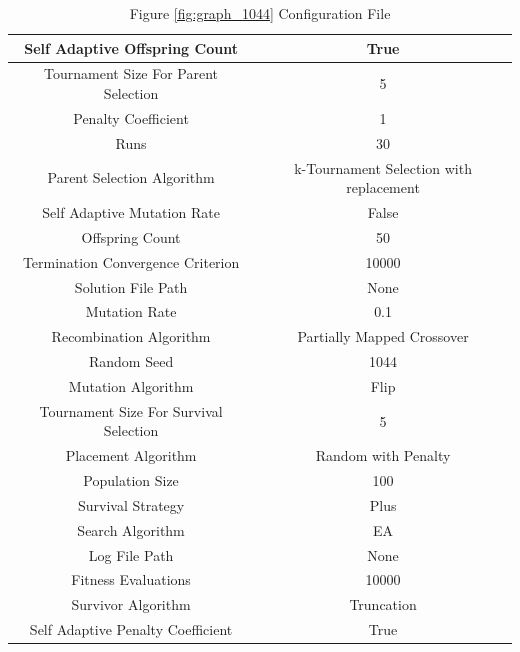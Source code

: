 \documentclass{standalone}
\begin{document}
\begin{table}[!htb]
	\centering
	\caption{Figure \ref{fig:graph_1044} Configuration File}
	\label{tab:graph_1044}
	\begin{tabular}{| c | c |}
		\hline
		Self Adaptive Offspring Count		& True		 \\
		\hline
		Tournament Size For Parent Selection		& 5		 \\
		\hline
		Penalty Coefficient		& 1		 \\
		\hline
		Runs		& 30		 \\
		\hline
		Parent Selection Algorithm		& k-Tournament Selection with replacement		 \\
		\hline
		Self Adaptive Mutation Rate		& False		 \\
		\hline
		Offspring Count		& 50		 \\
		\hline
		Termination Convergence Criterion		& 10000		 \\
		\hline
		Solution File Path		& None		 \\
		\hline
		Mutation Rate		& 0.1		 \\
		\hline
		Recombination Algorithm		& Partially Mapped Crossover		 \\
		\hline
		Random Seed		& 1044		 \\
		\hline
		Mutation Algorithm		& Flip		 \\
		\hline
		Tournament Size For Survival Selection		& 5		 \\
		\hline
		Placement Algorithm		& Random with Penalty		 \\
		\hline
		Population Size		& 100		 \\
		\hline
		Survival Strategy		& Plus		 \\
		\hline
		Search Algorithm		& EA		 \\
		\hline
		Log File Path		& None		 \\
		\hline
		Fitness Evaluations		& 10000		 \\
		\hline
		Survivor Algorithm		& Truncation		 \\
		\hline
		Self Adaptive Penalty Coefficient		& True		 \\
		\hline
	\end{tabular}
\end{table}
\end{document}
